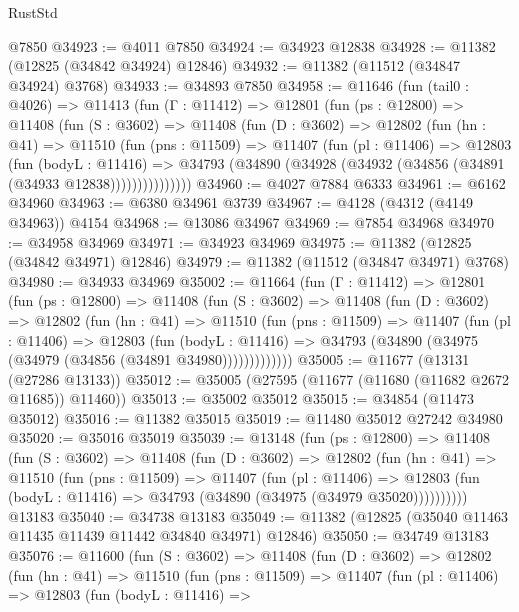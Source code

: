 \begin{lexlean}{RustStd}
\begin{coremodule}
    @7850
@34923 := @4011 @7850
@34924 := @34923 @12838
@34928 := @11382 (@12825 (@34842 @34924) @12846)
@34932 := @11382 (@11512 (@34847 @34924) @3768)
@34933 := @34893 @7850
@34958 := @11646
    (fun (tail0 : @4026) =>
    @11413
      (fun (Γ : @11412) =>
      @12801
        (fun (ps : @12800) =>
        @11408
          (fun (S : @3602) =>
          @11408
            (fun (D : @3602) =>
            @12802
              (fun (hn : @41) =>
              @11510
                (fun (pns : @11509) =>
                @11407
                  (fun (pl : @11406) =>
                  @12803
                    (fun (bodyL : @11416) =>
                    @34793 (@34890 (@34928 (@34932 (@34856 (@34891 (@34933 @12838)))))))))))))))
@34960 := @4027 @7884 @6333
@34961 := @6162 @34960
@34963 := @6380 @34961 @3739
@34967 := @4128 (@4312 (@4149 @34963)) @4154
@34968 := @13086 @34967
@34969 := @7854 @34968
@34970 := @34958 @34969
@34971 := @34923 @34969
@34975 := @11382 (@12825 (@34842 @34971) @12846)
@34979 := @11382 (@11512 (@34847 @34971) @3768)
@34980 := @34933 @34969
@35002 := @11664
    (fun (Γ : @11412) =>
    @12801
      (fun (ps : @12800) =>
      @11408
        (fun (S : @3602) =>
        @11408
          (fun (D : @3602) =>
          @12802
            (fun (hn : @41) =>
            @11510
              (fun (pns : @11509) =>
              @11407
                (fun (pl : @11406) =>
                @12803
                  (fun (bodyL : @11416) =>
                  @34793 (@34890 (@34975 (@34979 (@34856 (@34891 @34980)))))))))))))
@35005 := @11677 (@13131 (@27286 @13133))
@35012 := @35005 (@27595 (@11677 (@11680 (@11682 @2672 @11685)) @11460))
@35013 := @35002 @35012
@35015 := @34854 (@11473 @35012)
@35016 := @11382 @35015
@35019 := @11480 @35012 @27242 @34980
@35020 := @35016 @35019
@35039 := @13148
    (fun (ps : @12800) =>
    @11408
      (fun (S : @3602) =>
      @11408
        (fun (D : @3602) =>
        @12802
          (fun (hn : @41) =>
          @11510
            (fun (pns : @11509) =>
            @11407
              (fun (pl : @11406) =>
              @12803 (fun (bodyL : @11416) => @34793 (@34890 (@34975 (@34979 @35020))))))))))
    @13183
@35040 := @34738 @13183
@35049 := @11382 (@12825 (@35040 @11463 @11435 @11439 @11442 @34840 @34971) @12846)
@35050 := @34749 @13183
@35076 := @11600
    (fun (S : @3602) =>
    @11408
      (fun (D : @3602) =>
      @12802
        (fun (hn : @41) =>
        @11510
          (fun (pns : @11509) =>
          @11407
            (fun (pl : @11406) =>
            @12803
              (fun (bodyL : @11416) =>

\end{coremodule}
\end{lexlean}
